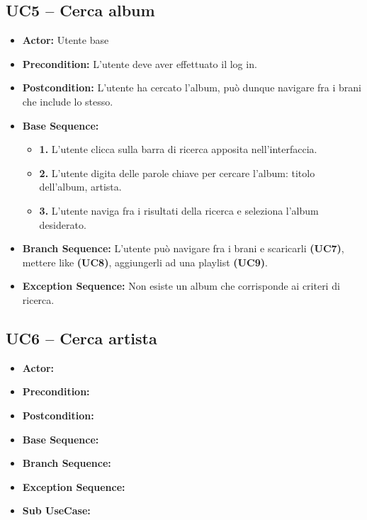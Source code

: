 \subsection{\textbf{UC5 -- Cerca album}}
\begin{itemize}
    \item \textbf{Actor:} Utente base
    \item \textbf{Precondition:} L'utente deve aver effettuato il log in.
    \item \textbf{Postcondition:} L'utente ha cercato l'album, può dunque navigare fra i brani che include lo stesso.
    \item \textbf{Base Sequence:}
    \begin{itemize}
        \item \textbf{1.} L'utente clicca sulla barra di ricerca apposita nell'interfaccia.
        \item \textbf{2.} L'utente digita delle parole chiave per cercare l'album: titolo dell'album, artista.
        \item \textbf{3.} L'utente naviga fra i risultati della ricerca e seleziona l'album desiderato.
    \end{itemize}
    \item \textbf{Branch Sequence:} L'utente può navigare fra i brani e scaricarli \textbf{(UC7)}, mettere like \textbf{(UC8)}, aggiungerli ad una playlist \textbf{(UC9)}.
    \item \textbf{Exception Sequence:} Non esiste un album che corrisponde ai criteri di ricerca.

\end{itemize}

\subsection{\textbf{UC6 -- Cerca artista}}
\begin{itemize}
    \item \textbf{Actor:}
    \item \textbf{Precondition:}
    \item \textbf{Postcondition:}
    \item \textbf{Base Sequence:}
    \item \textbf{Branch Sequence:}
    \item \textbf{Exception Sequence:}
    \item \textbf{Sub UseCase:}
\end{itemize}

